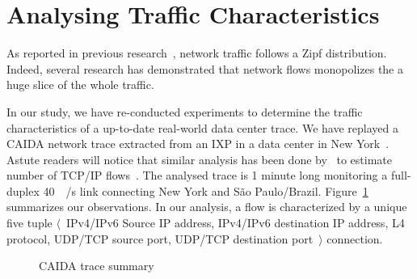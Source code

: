 \section{Analysing Traffic Characteristics}\label{sec:traffic}

As reported in previous research~\cite{Sarrar:2012}, network traffic follows a Zipf distribution.
Indeed, several research has demonstrated that network flows monopolizes the a huge slice of the whole traffic.

In our study, we have re-conducted experiments to determine the traffic characteristics of a up-to-date real-world data center trace.
We have replayed a CAIDA network trace extracted from an IXP in a data center in New York~\cite{caida:19}.
Astute readers will notice that similar analysis has been done by~\citeauthor{Spang:19} to estimate number of TCP/IP flows~\cite{Spang:19}.
The analysed trace is 1 minute long monitoring a full-duplex \SI{40}{\giga\bit/\second} link connecting New York and S\~ao Paulo/Brazil.
Figure~\ref{fig:traces} summarizes our observations. In our analysis, a flow is characterized by a unique five tuple $\langle$~IPv4/IPv6 Source IP address, IPv4/IPv6 destination IP address, L4 protocol, UDP/TCP source port, UDP/TCP destination port~$\rangle$ connection.

\begin{figure}[]
\centering
{}
\caption{CAIDA trace summary}
\label{fig:traces}
\end{figure}


